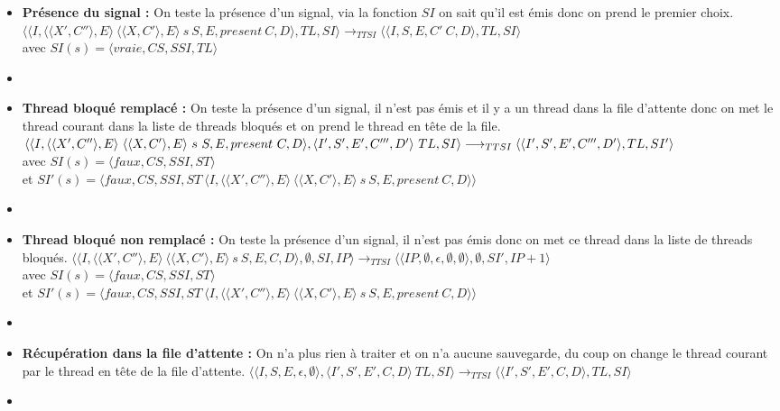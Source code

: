 \documentclass[10pt,a4paper]{report}
\begin{document}
\begin{enumerate}
\begin{itemize}
			\item[] \textbf{Présence du signal :} On teste la présence d'un signal, via la fonction $SI$ on sait qu'il est émis donc on prend le premier choix.
			\smallbreak
			$\langle\langle I,\langle\langle X',C''\rangle,E\rangle~\langle\langle X,C'\rangle,E\rangle~s~S,E,present~C,D\rangle,TL,SI\rangle 
			\longrightarrow_{TTSI} 
			\langle\langle I,S,E,C'~C,D\rangle,TL,SI\rangle$ 
			\\avec $SI(s) = \langle vraie,CS,SSI,TL\rangle$
			\item[] \newpage
			
			
			
			
			\item[] \textbf{ Thread bloqué remplacé :} On teste la présence d'un signal, il n'est pas émis et il y a un thread dans la file d'attente donc on met le thread courant dans la liste de threads bloqués et on prend le thread en tête de la file.
			\smallbreak
			$\langle\langle I,\langle\langle X',C''\rangle,E\rangle~\langle\langle X,C'\rangle,E\rangle~s~S,E,present~C,D\rangle,\langle I',S',E',C''',D'\rangle~TL,SI\rangle 
			\\\longrightarrow_{TTSI} 
			\langle\langle I',S',E',C''',D'\rangle,TL,SI'\rangle$ 
			\\avec $SI(s) = \langle faux,CS,SSI,ST\rangle$
			\\et $SI'(s) = \langle faux,CS,SSI,ST~\langle I,\langle\langle X',C''\rangle,E\rangle~\langle\langle X,C'\rangle,E\rangle~s~S,E,present~C,D\rangle\rangle$
			\item[]	
			
			\item[] \textbf{Thread bloqué non remplacé :} On teste la présence d'un signal, il n'est pas émis donc on met ce thread dans la liste de threads bloqués.
			\smallbreak 
			$\langle\langle I,\langle\langle X',C''\rangle,E\rangle~\langle\langle X,C'\rangle,E\rangle~s~S,E,C,D\rangle,\emptyset,SI,IP\rangle 
			\longrightarrow_{TTSI} 
			\langle\langle IP,\emptyset,\epsilon,\emptyset,\emptyset\rangle,\emptyset,SI',IP+1\rangle$
			\\avec $SI(s) = \langle faux,CS,SSI,ST\rangle$
			\\et $SI'(s) = \langle faux,CS,SSI,ST~\langle I,\langle\langle X',C''\rangle,E\rangle~\langle\langle X,C'\rangle,E\rangle~s~S,E,present~C,D\rangle\rangle$
			\item[]
			
			\item[] \textbf{Récupération dans la file d'attente :} On n'a plus rien à traiter et on n'a aucune sauvegarde, du coup on change le thread courant par le thread en tête de la file d'attente.
			\smallbreak
			$\langle\langle I,S,E,\epsilon,\emptyset\rangle,\langle I',S',E',C,D\rangle~TL,SI\rangle 
			\longrightarrow_{TTSI} 
			\langle\langle I',S',E',C,D\rangle,TL,SI\rangle$
			\item[]
			

\end{itemize}
\end{enumerate}
\end{document}
